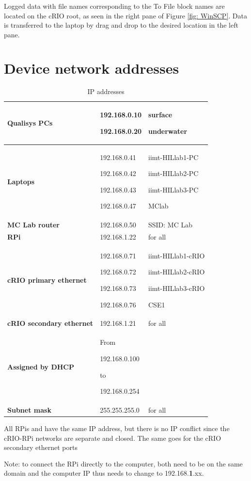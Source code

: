 \documentclass[a4paper,twoside,english]{report}
\providecommand{\tabularnewline}{\\}
\begin{document}
Logged data with file names corresponding to the To File block names
are located on the cRIO root, as seen in the right pane of Figure
\ref{fig: WinSCP}. Data is transferred to the laptop by drag and
drop to the desired location in the left pane.

\chapter{Device network addresses}

\begin{table}[h!]
\centering{}%
\begin{tabular}{>{\bfseries}l>{\raggedright}p{2.4cm}>{\raggedright}p{3cm}}
\toprule 
Qualisys PCs & 192.168.0.10

192.168.0.20 & surface

underwater\tabularnewline
\midrule 
Laptops & 192.168.0.41

192.168.0.42

192.168.0.43

192.168.0.47 & iimt-HILlab1-PC

iimt-HILlab2-PC

iimt-HILlab3-PC

MClab\tabularnewline
\midrule 
MC Lab router & 192.168.0.50 & SSID: MC Lab\tabularnewline
\midrule 
RPi & 192.168.1.22 & for all\tabularnewline
\midrule 
cRIO primary ethernet & 192.168.0.71

192.168.0.72

192.168.0.73

192.168.0.76 & iimt-HILlab1-cRIO

iimt-HILlab2-cRIO

iimt-HILlab3-cRIO

CSE1\tabularnewline
cRIO secondary ethernet & 192.168.1.21 & for all\tabularnewline
\midrule 
Assigned by DHCP & From

192.168.0.100

to

192.168.0.254 & \tabularnewline
\midrule 
Subnet mask & 255.255.255.0 & for all\tabularnewline
\bottomrule
\end{tabular}\caption{IP addresses}
\label{tab: IP addresses} 
\end{table}

All RPis and have the same IP address, but there is no IP conflict
since the cRIO-RPi networks are separate and closed. The same goes
for the cRIO secondary ethernet ports 

Note: to connect the RPi directly to the computer, both need to be
on the same domain and the computer IP thus needs to change to 192.168.\textbf{1}.xx.
\end{document}
